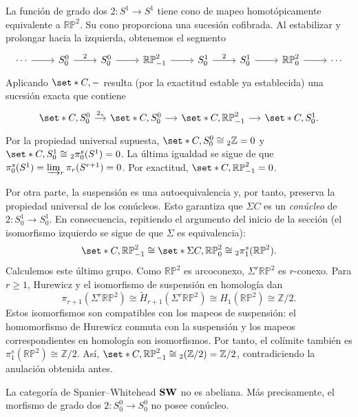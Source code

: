 La función de grado dos $2\colon S^1\to S^1$ tiene cono de mapeo homotópicamente equivalente a $\mathbb{RP}^2$. Su cono proporciona una sucesión cofibrada. Al estabilizar y prolongar hacia la izquierda, obtenemos el segmento
\[
\begin{tikzcd}
\cdots \arrow[r] &
S^0_0 \arrow[r,"2"] &
S^0_0 \arrow[r] &
\mathbb{RP}^2_{-1} \arrow[r] &
S^1_0 \arrow[r,"2"] &
S^1_0 \arrow[r] &
\mathbb{RP}^2_0 \arrow[r] &
\cdots
\end{tikzcd}
\]
Aplicando $\set*{C,-}$ resulta (por la exactitud estable ya establecida) una sucesión exacta que contiene
\[
\begin{tikzcd}[column sep=small]
\set*{C,S^0_0} \arrow[r,"2_*"] & \set*{C,S^0_0} \arrow[r] &
\set*{C,\mathbb{RP}^2_{-1}} \arrow[r] & \set*{C,S^1_0}.
\end{tikzcd}
\]
Por la propiedad universal supuesta, $\set*{C,S^0_0}\cong{}_2\mathbb Z=0$ y $\set*{C,S^1_0}\cong{}_2\pi_0^s(S^1)=0$. La última igualdad se sigue de que $\pi_0^s(S^1)=\varinjlim\nolimits_r\pi_r(S^{r+1})=0$. Por exactitud, $\set*{C,\mathbb{RP}^2_{-1}}=0$.

Por otra parte, la suspensión es una autoequivalencia y, por tanto, preserva la propiedad universal de los conúcleos. Esto garantiza que $\Sigma C$ es un \emph{conúcleo} de $2\colon S^1_0\to S^1_0$. En consecuencia, repitiendo el argumento del inicio de la sección (el isomorfismo izquierdo se sigue de que $\Sigma$ es equivalencia):
\[
\set*{C,\mathbb{RP}^2_{-1}}
\cong\set*{\Sigma C,\mathbb{RP}^2_0}
\cong{}_2\pi_1^s(\mathbb{RP}^2).
\]
Calculemos este último grupo. Como $\mathbb{RP}^2$ es arcoconexo, $\Sigma^r\mathbb{RP}^2$ es $r$-conexo. Para $r\geq1$, Hurewicz y el isomorfismo de suspensión en homología dan
\[
\pi_{r+1}(\Sigma^r\mathbb{RP}^2)
\cong\widetilde H_{r+1}(\Sigma^r\mathbb{RP}^2)
\cong H_1(\mathbb{RP}^2)\cong\mathbb Z/2.
\]
Estos isomorfismos son compatibles con los mapeos de suspensión: el homomorfismo de Hurewicz conmuta con la suspensión y los mapeos correspondientes en homología son isomorfismos. Por tanto, el colímite también es $\pi_1^s(\mathbb{RP}^2)\cong\mathbb Z/2$. Así, $\set*{C,\mathbb{RP}^2_{-1}}\cong{}_2(\mathbb Z/2)=\mathbb Z/2$, contradiciendo la anulación obtenida antes.

\begin{teo}
La categoría de Spanier--Whitehead $\mathbf{SW}$ no es abeliana. Más precisamente, el morfismo de grado dos $2\colon S^0_0\to S^0_0$ no posee conúcleo.
\end{teo}

